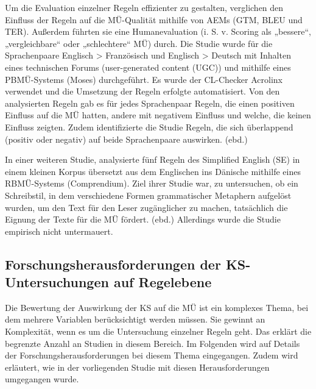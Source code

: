 Um die Evaluation einzelner Regeln effizienter zu gestalten, verglichen \citet{RoturierEtAl2012} den Einfluss der Regeln auf die MÜ-Qualität mithilfe von AEMs (GTM, BLEU und TER). Außerdem führten sie eine Humanevaluation (i. S. v. Scoring als „bessere“, „vergleichbare“ oder „schlechtere“ MÜ) durch. Die Studie wurde für die Sprachenpaare Englisch > Französisch und Englisch > Deutsch mit Inhalten eines technischen Forums (user-generated content (UGC)) und mithilfe eines PBMÜ-Systems (Moses) durchgeführt. Es wurde der CL-Checker Acrolinx verwendet und die Umsetzung der Regeln erfolgte automatisiert. Von den analysierten Regeln gab es für jedes Sprachenpaar Regeln, die einen positiven Einfluss auf die MÜ hatten, andere mit negativem Einfluss und welche, die keinen Einfluss zeigten. Zudem identifizierte die Studie Regeln, die sich überlappend (positiv oder negativ) auf beide Sprachenpaare auswirken. (ebd.)

In einer weiteren Studie, analysierte \citet{Møller2003} fünf Regeln des Simplified English (SE) in einem kleinen Korpus übersetzt aus dem Englischen ins Dänische mithilfe eines RBMÜ-Systems (Comprendium). Ziel ihrer Studie war, zu untersuchen, ob ein Schreibstil, in dem verschiedene Formen grammatischer Metaphern aufgelöst wurden, um den Text für den Leser zugänglicher zu machen, tatsächlich die Eignung der Texte für die MÜ fördert. (ebd.) Allerdings wurde die Studie empirisch nicht untermauert.

\subsection{Forschungsherausforderungen der KS-Untersuchungen auf Regelebene}
\label{sec:3.4.3}
Die Bewertung der Auswirkung der KS auf die MÜ ist ein komplexes Thema, bei dem mehrere Variablen berücksichtigt werden müssen. Sie gewinnt an Komplexität, wenn es um die Untersuchung einzelner Regeln geht. Das erklärt die begrenzte Anzahl an Studien in diesem Bereich. Im Folgenden wird auf Details der Forschungsherausforderungen bei diesem Thema eingegangen. Zudem wird erläutert, wie in der vorliegenden Studie mit diesen Herausforderungen umgegangen wurde.

